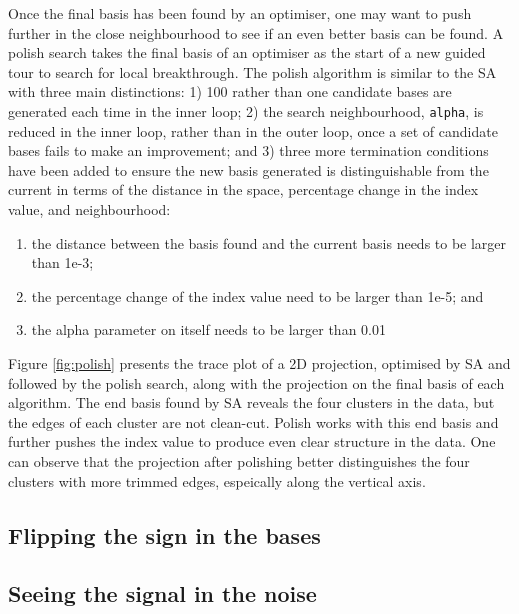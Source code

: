 Once the final basis has been found by an optimiser, one may want to
push further in the close neighbourhood to see if an even better basis
can be found. A polish search takes the final basis of an optimiser as
the start of a new guided tour to search for local breakthrough. The
polish algorithm is similar to the SA with three main distinctions: 1)
100 rather than one candidate bases are generated each time in the inner
loop; 2) the search neighbourhood, \texttt{alpha}, is reduced in the
inner loop, rather than in the outer loop, once a set of candidate bases
fails to make an improvement; and 3) three more termination conditions
have been added to ensure the new basis generated is distinguishable
from the current in terms of the distance in the space, percentage
change in the index value, and neighbourhood:

\begin{enumerate}
\def\labelenumi{\arabic{enumi})}
\tightlist
\item
  the distance between the basis found and the current basis needs to be
  larger than 1e-3;
\item
  the percentage change of the index value need to be larger than 1e-5;
  and
\item
  the alpha parameter on itself needs to be larger than 0.01
\end{enumerate}

Figure \ref{fig:polish} presents the trace plot of a 2D projection,
optimised by SA and followed by the polish search, along with the
projection on the final basis of each algorithm. The end basis found by
SA reveals the four clusters in the data, but the edges of each cluster
are not clean-cut. Polish works with this end basis and further pushes
the index value to produce even clear structure in the data. One can
observe that the projection after polishing better distinguishes the
four clusters with more trimmed edges, espeically along the vertical
axis.

\hypertarget{flipping-the-sign-in-the-bases}{%
\subsection{Flipping the sign in the
bases}\label{flipping-the-sign-in-the-bases}}

\hypertarget{seeing-the-signal-in-the-noise}{%
\subsection{Seeing the signal in the
noise}\label{seeing-the-signal-in-the-noise}}


